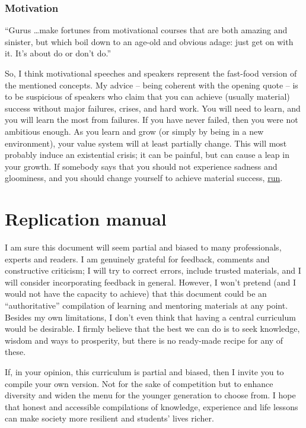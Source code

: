 \documentclass{article}
\begin{document}
\subsubsection{Motivation}

\vspace{1cm}
{``Gurus \dots make fortunes from motivational courses that are both amazing and sinister,
but which boil down to an age-old and obvious adage: just get on with it.
It’s about do or don’t do.''
\\[5pt]
}

So, I think motivational speeches and speakers represent the fast-food version of the mentioned concepts. My advice -- being coherent with the opening quote -- is to be suspicious of speakers who claim that you can achieve (usually material) success without major failures, crises, and hard work.
You will need to learn, and you will learn the most from failures. If you have never failed, then you were not ambitious enough.
As you learn and grow (or simply by being in a new environment), your value system will at least partially change. This will most probably induce an existential crisis; it can be painful, but can cause a leap in your growth.
If somebody says that you should not experience sadness and gloominess, and you should change yourself to achieve material success, \href{https://www.youtube.com/watch?v=NA4uTFeHEFA}{run}.


\section{Replication manual}

I am sure this document will seem partial and biased to many professionals, experts and readers. I am genuinely grateful for feedback, comments and constructive criticism; I will try to correct errors, include trusted materials, and I will consider incorporating feedback in general. However, I won't pretend (and I would not have the capacity to achieve) that this document could be an ``authoritative'' compilation of learning and mentoring materials at any point. Besides my own limitations, I don't even think that having a central curriculum would be desirable. I firmly believe that the best we can do is to seek knowledge, wisdom and ways to prosperity, but there is no ready-made recipe for any of these.

If, in your opinion, this curriculum is partial and biased, then I invite you to compile your own version. Not for the sake of competition but to enhance diversity and widen the menu for the younger generation to choose from.
I hope that honest and accessible compilations of knowledge, experience and life lessons can make society more resilient and students' lives richer. 
\end{document}
